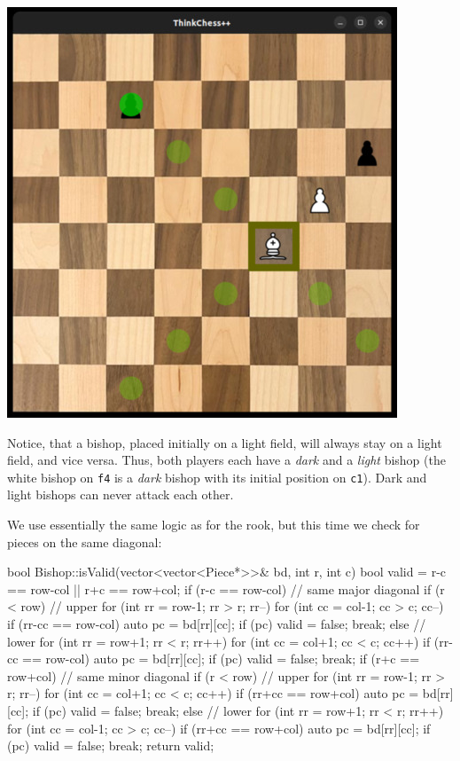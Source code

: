 \begin{center}
\includegraphics[width=.5\linewidth]{img/bishop.jpg}
\end{center}

Notice, that a bishop, placed initially on a light field, will always stay on a light field,
and vice versa.
Thus, both players each have a \emph{dark} and a \emph{light} bishop (the white bishop on
\texttt{f4} is a \emph{dark} bishop with its initial position on \texttt{c1}).
Dark and light bishops can never attack each other.

We use essentially the same logic as for the rook, but this time we check for pieces on
the same diagonal:

\begin{cpp}
bool Bishop::isValid(vector<vector<Piece*>>& bd, int r, int c) {
  bool valid = r-c == row-col || r+c == row+col;
  if (r-c == row-col) { // same major diagonal
    if (r < row) { // upper
      for (int rr = row-1; rr > r; rr--) {
        for (int cc = col-1; cc > c; cc--) {
          if (rr-cc == row-col) {
            auto pc = bd[rr][cc];
            if (pc) { valid = false; break; }
          }
        }
      }
    } else { // lower
      for (int rr = row+1; rr < r; rr++) {
        for (int cc = col+1; cc < c; cc++) {
          if (rr-cc == row-col) {
            auto pc = bd[rr][cc];
            if (pc) { valid = false; break; }
          }
        }
      }
    }
  }
  if (r+c == row+col) { // same minor diagonal
    if (r < row) { // upper
      for (int rr = row-1; rr > r; rr--) {
        for (int cc = col+1; cc < c; cc++) {
          if (rr+cc == row+col) {
            auto pc = bd[rr][cc];
            if (pc) { valid = false; break; }
          }
        }
      }
    } else { // lower
      for (int rr = row+1; rr < r; rr++) {
        for (int cc = col-1; cc > c; cc--) {
          if (rr+cc == row+col) {
            auto pc = bd[rr][cc];
            if (pc) { valid = false; break; }
          }
        }
      }
    }
  }
  return valid;
}
\end{cpp}

